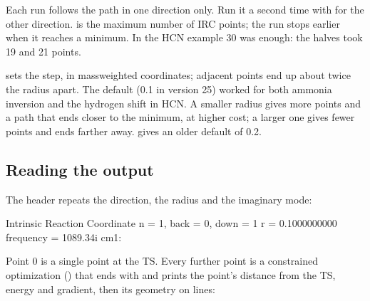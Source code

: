 \documentclass[letterpaper,10pt,english,openany,oneside]{sphinxmanual}
\begin{document}
\sphinxAtStartPar
Each run follows the path in one direction only. Run it a second time with  for the other direction.
{\hyperref[\detokenize{reference/optimize:optimize-points}]{}} is the maximum number of IRC points; the run stops earlier when it reaches a minimum.
In the HCN example 30 was enough: the halves took 19 and 21 points.



\sphinxAtStartPar
{\hyperref[\detokenize{reference/optimize:optimize-radius}]{}} sets the step, in mass\sphinxhyphen{}weighted coordinates; adjacent points end up about twice
the radius apart. The default (0.1 in version 25) worked for both ammonia inversion and the hydrogen shift in HCN.
A smaller radius gives more points and a path that ends closer to the minimum, at higher cost; a larger one gives
fewer points and ends farther away.  gives an older default of 0.2.




\subsection{Reading the output}
\label{\detokenize{tasks/ts-irc-scan:id3}}
\sphinxAtStartPar
The header repeats the direction, the radius and the imaginary mode:

\begin{sphinxVerbatim}[commandchars=\\\{\}]
 Intrinsic Reaction Coordinate
 \PYGZhy{}\PYGZhy{}\PYGZhy{}\PYGZhy{}\PYGZhy{}\PYGZhy{}\PYGZhy{}\PYGZhy{}\PYGZhy{}\PYGZhy{}\PYGZhy{}\PYGZhy{}\PYGZhy{}\PYGZhy{}\PYGZhy{}\PYGZhy{}\PYGZhy{}\PYGZhy{}\PYGZhy{}\PYGZhy{}\PYGZhy{}\PYGZhy{}\PYGZhy{}\PYGZhy{}\PYGZhy{}\PYGZhy{}\PYGZhy{}\PYGZhy{}\PYGZhy{}
 n = 1, back = 0, down = 1
 r = 0.1000000000
 frequency = 1089.34i cm\PYGZca{}\PYGZhy{}1:
\end{sphinxVerbatim}



\sphinxAtStartPar
Point 0 is a single point at the TS. Every further point is a constrained optimization () that ends with  and prints the point’s distance from the TS, energy and
gradient, then its geometry on  lines:
\end{document}

